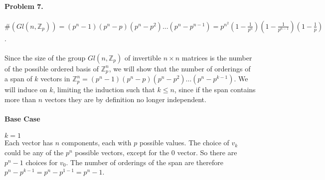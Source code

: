 \documentclass[12pt, letterpaper]{article}
\begin{document}
\paragraph{Problem 7.} \(\#(Gl(n, \mathbb{Z}_p)) = (p^n - 1)(p^n - p)(p^n - p^{2})...(p^n - p^{n-1}) =  p^{n^2}(1 - \frac{1}{p^n})(1 - \frac{1}{p^{n-1}})(1 - \frac{1}{p})\).
\\
\\
Since the size of the group \(Gl(n, \mathbb{Z}_p)\) of invertible \(n \times n\) matrices is the number of the possible ordered basis of \(\mathbb{Z}_p^n\), we will show that the number of orderings of a span of \(k\) vectors in \(\mathbb{Z}_p^n = (p^n - 1)(p^n - p)(p^n - p^{2})...(p^n - p^{k-1})\). We will induce on \(k\), limiting the induction such that \(k \leq n\), since if the span contains more than \(n\) vectors they are by definition no longer independent.

\paragraph{Base Case} \(k = 1\) \\
Each vector has \(n\) components, each with \(p\) possible values. The choice of \(v_k\) could be any of the \(p^n\) possible vectors, except for the 0 vector. So there are \(p^n - 1\) choices for \(v_0\). The number of orderings of the span are therefore \(p^n - p^{k-1} = p^n - p^{1-1} = p^n - 1\).
\end{document}
